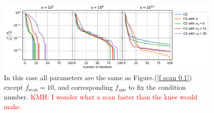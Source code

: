 \documentclass[twocolumn,linenumbers]{aastex631}
\newcommand{\kmh}[1]{\textcolor{red}{KMH: #1}}
\begin{document}
\begin{figure}[htb!]
\includegraphics[width=\textwidth]{f_scan=10.pdf}
\caption{In this case all parameters are the same as
    Figure.(\ref{f scan 0.1}) except $f_{\text{scan}} = 10$,
    and corresponding $f_\text{apo}$ to fix the condition number. \kmh{I wonder what a scan faster than the knee would make.}
}
\label{f scan 10}
\end{figure}


 







{}



\end{document}
